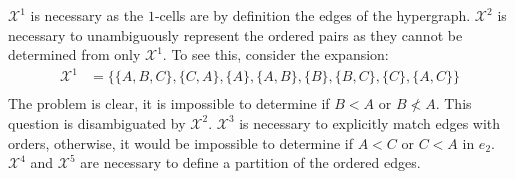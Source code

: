 \documentclass{article}
\theoremstyle{plain}
\theoremstyle{definition}
\theoremstyle{remark}
\newcommand{\cX}{\mathcal{X}}
\begin{document}
$\cX^1$ is necessary as the $1$-cells are by definition the edges of the hypergraph. $\cX^2$ is necessary to unambiguously represent the ordered pairs as they cannot be determined from only $\cX^1$. To see this, consider the expansion:
\begin{equation*}
	\begin{aligned}
		\cX^1 &= \big\{ \{A, B, C\}, \{C, A\},\{A\}, \{A, B\}, \{B\}, \{B, C\}, \{C\}, \{A, C\} \big\}\\
	\end{aligned}
\end{equation*}
The problem is clear, it is impossible to determine if $B < A$ or $B \nless A$. This question is disambiguated by $\cX^2$. $\cX^3$ is necessary to explicitly match edges with orders, otherwise, it would be impossible to determine if $A < C$ or $C < A$ in $e_2$. $\cX^4$ and $\cX^5$ are necessary to define a partition of the ordered edges.
\end{document}
